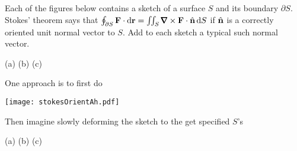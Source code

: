 


\subsection*{\Conceptual}

\begin{question}
Each of the figures below contains a sketch of a surface $S$ and
its boundary $\partial S$. Stokes' theorem says that
$\oint_{\partial S}\vF\cdot \dee{\vr}
=\dblInt_S\vnabla\times\vF\cdot\hn\,\dee{S}$
if $\hat{\mathbf{n}}$ is a correctly oriented unit normal vector to $S$. 
Add to each sketch a typical such normal vector.
\begin{center}
  (a)\quad {}\hfil
  (b)\quad {}\hfil
  (c)\quad {}
\end{center}
\end{question}

\begin{hint} 
One approach is to first do
\begin{center}
  \texttt{[image: stokesOrientAh.pdf]}
\end{center}
Then imagine slowly deforming the sketch to the get specified $S$'s
\end{hint}

\begin{answer} 
\begin{center}
  (a)\quad {}\hfil
  (b)\quad {}\hfil
  (c)\quad {}
\end{center}
\end{answer}

